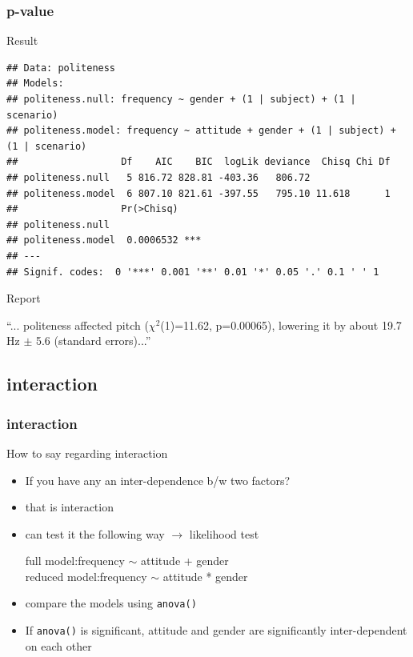 \documentclass[10p]{beamer}\usepackage[]{graphicx}\usepackage[]{color}
\makeatletter
\newenvironment{kframe}{%
 \def\at@end@of@kframe{}%
 \ifinner\ifhmode%
  \def\at@end@of@kframe{\end{minipage}}%
  \begin{minipage}{\columnwidth}%
 \fi\fi%
 \def\FrameCommand##1{\hskip\@totalleftmargin \hskip-\fboxsep
 \colorbox{shadecolor}{##1}\hskip-\fboxsep
     \hskip-\linewidth \hskip-\@totalleftmargin \hskip\columnwidth}%
 \MakeFramed {\advance\hsize-\width
   \@totalleftmargin\z@ \linewidth\hsize
   \@setminipage}}%
 {\par\unskip\endMakeFramed%
 \at@end@of@kframe}
\newenvironment{knitrout}{}{} %
\makeatother
\begin{document}
\begin{frame}[fragile]
\frametitle{p-value}
Result
\begin{knitrout}\scriptsize
{}\color{fgcolor}\begin{kframe}
\begin{verbatim}
## Data: politeness
## Models:
## politeness.null: frequency ~ gender + (1 | subject) + (1 | scenario)
## politeness.model: frequency ~ attitude + gender + (1 | subject) + (1 | scenario)
##                  Df    AIC    BIC  logLik deviance  Chisq Chi Df
## politeness.null   5 816.72 828.81 -403.36   806.72              
## politeness.model  6 807.10 821.61 -397.55   795.10 11.618      1
##                  Pr(>Chisq)    
## politeness.null                
## politeness.model  0.0006532 ***
## ---
## Signif. codes:  0 '***' 0.001 '**' 0.01 '*' 0.05 '.' 0.1 ' ' 1
\end{verbatim}
\end{kframe}
\end{knitrout}
Report
\begin{center}
\textrm{``... politeness affected pitch ($\chi^2$(1)=11.62, p=0.00065), lowering it by about 19.7 Hz $\pm$ 5.6 (standard errors)...''}
\end{center}
\end{frame}

\subsection{interaction}
\begin{frame}
\frametitle{interaction}
How to say regarding interaction
\begin{itemize}
\item If you have any an inter-dependence b/w two factors?
\item that is interaction
\item can test it the following way $\rightarrow$ likelihood test

full model:\quad frequency $\sim$ attitude + gender \\
reduced model:\quad frequency $\sim$ attitude * gender

\item compare the models using \texttt{anova()}
\item If \texttt{anova()} is significant, attitude and gender are significantly inter-dependent on each other

\end{itemize}
\end{frame}
\end{document}
